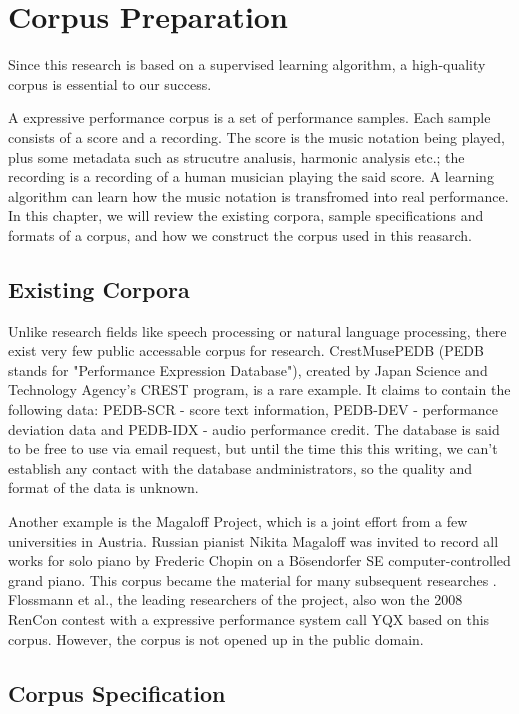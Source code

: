 \chapter{Corpus Preparation}
\label{chap:corpus}
Since this research is based on a supervised learning algorithm, a high-quality corpus is essential to our success. 

A expressive performance corpus is a set of performance samples. Each sample consists of a score and a recording. The score is the music notation being played, plus some metadata such as strucutre analusis, harmonic analysis etc.; the recording is a recording of a human musician playing the said score. A learning algorithm can learn how the music notation is transfromed into real performance. In this chapter, we will review the existing corpora, sample specifications and formats of a corpus, and how we construct the corpus used in this reasarch.

\section{Existing Corpora} 
Unlike research fields like speech processing or natural language processing, there exist very few public accessable corpus for research. CrestMusePEDB\cite{crestmuse} (PEDB stands for "Performance Expression Database"), created by Japan Science and Technology Agency's CREST program, is a rare example. It claims to contain the following data: PEDB-SCR - score text information, PEDB-DEV - performance deviation data and PEDB-IDX - audio performance credit. The database is said to be free to use via email request, but until the time this this writing, we can't establish any contact with the database andministrators, so the quality and format of the data is unknown.

Another example is the Magaloff Project\cite{magaloff}, which is a joint effort from a few universities in Austria.  Russian pianist Nikita Magaloff was invited to record all works for solo piano by Frederic Chopin on a Bösendorfer SE computer-controlled grand piano. This corpus became the material for many subsequent researches \cite{magaloff extendedi}. Flossmann et al., the leading researchers of the project, also won the 2008 RenCon contest with a expressive performance system call YQX\cite{yqx} based on this corpus. However, the corpus is not opened up in the public domain. 

\section{Corpus Specification}

